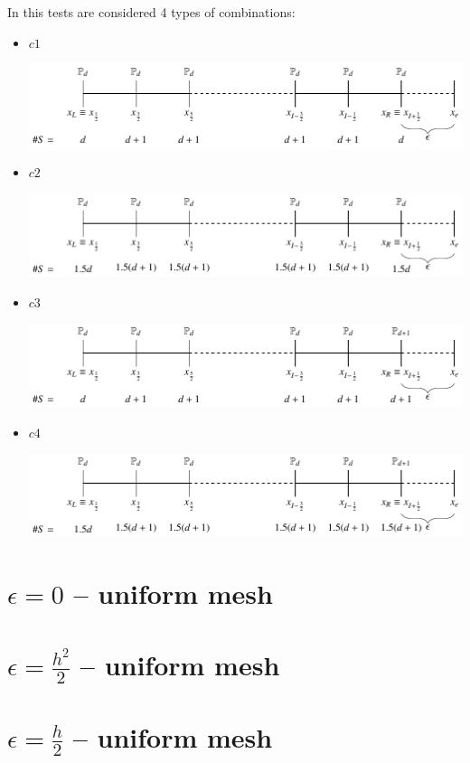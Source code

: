 \documentclass[12pt,a4paper]{article}
\begin{document}
In this tests are considered 4 types of combinations:
\begin{itemize}
\item $c1$
\begin{center}
\includegraphics[width=.75\textwidth]{images/c1.pdf}
\end{center}
\item $c2$
\begin{center}
\includegraphics[width=.75\textwidth]{images/c2.pdf}
\end{center}
\item $c3$
\begin{center}
\includegraphics[width=.75\textwidth]{images/c3.pdf}
\end{center}
\item $c4$
\begin{center}
\includegraphics[width=.75\textwidth]{images/c4.pdf}
\end{center}
\end{itemize}
\pagebreak
\section*{$\epsilon=0$ -- uniform mesh}



\section*{$\epsilon=\frac{h^2}{2}$ -- uniform mesh}





\section*{$\epsilon=\frac{h}{2}$ -- uniform mesh}




\end{document}
